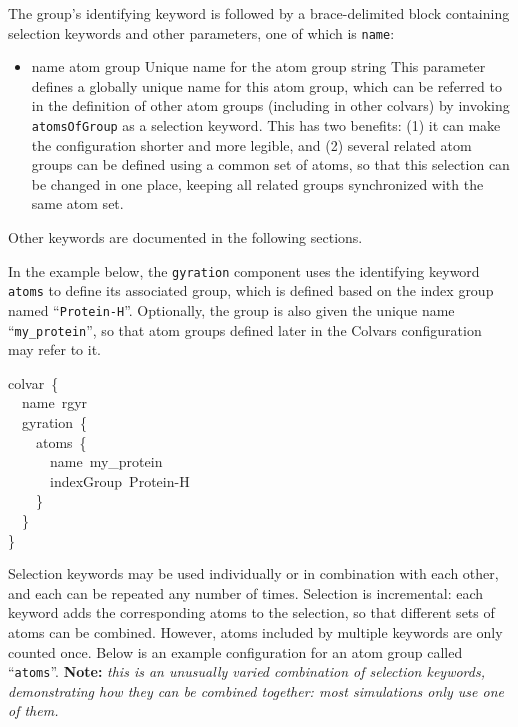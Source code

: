 The group's identifying keyword is followed by a brace-delimited block containing selection keywords and other parameters, one of which is \texttt{name}:
\begin{itemize}
\item \key
  {name}{%
  atom group}{%
  Unique name for the atom group}{%
  string}{%
  This parameter defines a globally unique name for this atom group, which can be referred to
  in the definition of other atom groups (including in other colvars) by invoking
  \texttt{atomsOfGroup} as a selection keyword.
  This has two benefits: (1) it can make the configuration shorter and more legible, and (2) several
  related atom groups can be defined using a common set of atoms, so that this selection can be
  changed in one place, keeping all related groups synchronized with the same atom set.}
\end{itemize}
Other keywords are documented in the following sections.

In the example below, the \texttt{gyration} component uses the identifying keyword \texttt{atoms} to define its associated group, which is defined based on the index group named ``\texttt{Protein-H}''.  Optionally, the group is also given the unique name ``\texttt{my\_protein}'', so that atom groups defined later in the Colvars configuration may refer to it.
\begin{cvexampleinput}
\-colvar~\{\\
\-~~name~rgyr\\
\-~~gyration~\{\\
\-~~~~atoms~\{\\
\-~~~~~~name~my\_protein\\
\-~~~~~~indexGroup~Protein-H\\
\-~~~~\}\\
\-~~\}\\
\-\}
\end{cvexampleinput}


Selection keywords may be used individually or in combination with each other, and each can be repeated any number of times.
Selection is incremental: each keyword adds the corresponding atoms to the selection, so that different sets of atoms can be combined.
However, atoms included by multiple keywords are only counted once.
Below is an example configuration for an atom group called ``\texttt{atoms}''.
\textbf{Note: }\emph{this is an unusually varied combination of selection keywords, demonstrating how they can be combined together: most simulations only use one of them.}\\

